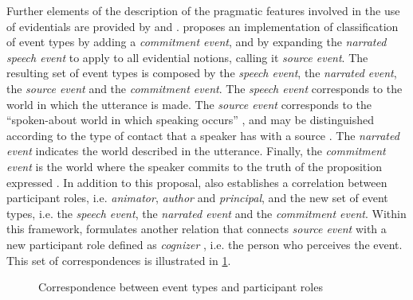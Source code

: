 \documentclass[output=paper]{langsci/langscibook}
\begin{document}
Further elements of the description of the pragmatic features involved in the use of evidentials are provided by \citet{Kockelman2004} and \citet{Bergqvist2018c}. \citet{Kockelman2004} proposes an implementation of  classification of event types by adding a \textit{commitment event}, and by expanding the \textit{narrated speech event} to apply to all evidential notions, calling it \textit{source event}. The resulting set of event types is composed by the \textit{speech event}, the \textit{narrated event}, the \textit{source event} and the \textit{commitment event}. The \textit{speech event} corresponds to the world in which the utterance is made. The \textit{source event} corresponds to the “spoken-about world in which speaking occurs” \citep[128]{Kockelman2004}, and may be distinguished according to the type of contact that a speaker has with a source \citep[143]{Kockelman2004}. The \textit{narrated event} indicates the world described in the utterance. Finally, the \textit{commitment event} is the world where the speaker commits to the truth of the proposition expressed \citep[127]{Kockelman2004}. In addition to this proposal, \citet{Kockelman2004} also establishes a correlation between  participant roles, i.e. \textit{animator}, \textit{author} and \textit{principal}, and the new set of event types, i.e. the \textit{speech event}, the \textit{narrated event} and the \textit{commitment event}. Within this framework, \citet{Bergqvist2018c} formulates another relation that connects \textit{source event} \citep[128]{Kockelman2004} with a new participant role defined as \textit{cognizer} \citep[22]{Bergqvist2018c}, i.e. the person who perceives the event. This set of correspondences is illustrated in \ref{fig:gq1}.


\begin{figure}
\missingfigure{~}
\caption{Correspondence between event types and participant roles}
\label{fig:gq1}
\end{figure}
\end{document}
